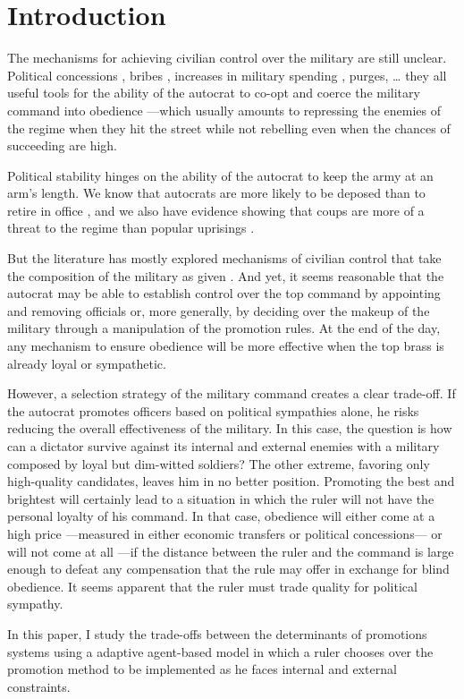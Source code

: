 \section{Introduction}

The mechanisms for achieving civilian control over the military are still
unclear. Political concessions \citep{leon:2009,svolik:2012a}, bribes
\citep{goda:2000}, increases in military spending \citep{rivero:2011}, purges,
\dots{} they all useful tools for the ability of the autocrat to co-opt and
coerce \citep{gandhi:2007} the military command into obedience ---which usually
amounts to repressing the enemies of the regime when they hit the street while
not rebelling even when the chances of succeeding are high.

Political stability hinges on the ability of the autocrat to keep the army at an
arm's length. We know that autocrats are more likely to be deposed than to
retire in office \citep{escriba:2013}, and we also have evidence showing that
coups are more of a threat to the regime than popular uprisings
\citep{gandhi:2008}. 

But the literature has mostly explored mechanisms of civilian control that take
the composition of the military as given \citep{acemoglu:2010}. And yet, it
seems reasonable that the autocrat may be able to establish control over the top
command by appointing and removing officials or, more generally, by deciding
over the makeup of the military through a manipulation of the promotion rules.
At the end of the day, any mechanism to ensure obedience will be more effective
when the top brass is already loyal or sympathetic.

However, a selection strategy of the military command creates a clear trade-off.
If the autocrat promotes officers based on political sympathies alone, he risks
reducing the overall effectiveness of the military. In this case, the question
is how can a dictator survive against its internal and external enemies with a
military composed by loyal but dim-witted soldiers? The other extreme, favoring
only high-quality candidates, leaves him in no better position. Promoting the
best and brightest will certainly lead to a situation in which the ruler will
not have the personal loyalty of his command. In that case, obedience will
either come at a high price ---measured in either economic transfers or
political concessions--- or will not come at all ---if the distance between the
ruler and the command is large enough to defeat any compensation that the rule
may offer in exchange for blind obedience. It seems apparent that the ruler must
trade quality for political sympathy.

In this paper, I study the trade-offs between the determinants of promotions
systems using a adaptive agent-based model in which a ruler chooses over the
promotion method to be implemented as he faces internal and external
constraints.

